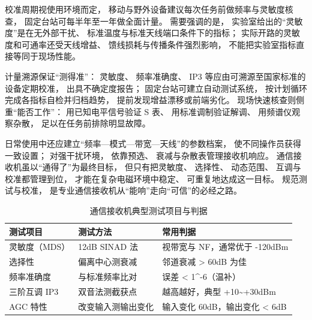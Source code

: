 校准周期视使用环境而定，
移动与野外设备建议每次任务前做频率与灵敏度核查，
固定台站可每半年至一年做全面计量。
需要强调的是，
实验室给出的“灵敏度”是在无外部干扰、
标准温度与标准天线端口条件下的指标；
实际开路的灵敏度和可通率还受天线增益、
馈线损耗与传播条件强烈影响，
不能把实验室指标直接等同于现场性能。

计量溯源保证“测得准”：
灵敏度、
频率准确度、
IP3 等应由可溯源至国家标准的设备定期校准，
出具不确定度报告；
固定台站可建立自动测试系统，
按计划循环完成各指标自检并归档趋势，
提前发现增益漂移或前端劣化。
现场快速核查则侧重“能否工作”：
用已知电平信号验证 S 表、
用标准调制验证解调、
用频谱仪观察杂散，
足以在任务前排除明显故障。

日常使用中还应建立“频率—模式—带宽—天线”的参数档案，
使不同操作员获得一致设置；
对强干扰环境，
依靠预选、
衰减与杂散表管理接收机响应。
通信接收机虽以“通得了”为最终目标，
但只有把灵敏度、
选择性、
动态范围、
互调与校准都管理到位，
才能在复杂电磁环境中稳定、
可重复地达成这一目标。
规范测试与校准，
是专业通信接收机从“能响”走向“可信”的必经之路。

\begin{table}[htbp]
\centering
\caption{通信接收机典型测试项目与判据}
\begin{tabular}{|p{4cm}|p{5.5cm}|p{5cm}|}
\hline
\textbf{测试项目} & \textbf{测试方法} & \textbf{常用判据} \\
\hline
灵敏度（MDS） & 12dB SINAD 法 & 视带宽与 NF，通常优于 -120dBm \\
\hline
选择性 & 偏离中心测衰减 & 邻道衰减 > 60dB 为佳 \\
\hline
频率准确度 & 与标准频率比对 & 误差 < 1\times10^{-6}（温补） \\
\hline
三阶互调 IP3 & 双音法测截获点 & 越高越好，典型 +10\sim+30dBm \\
\hline
AGC 特性 & 改变输入测输出变化 & 输入变化 60dB，输出变化 < 6dB \\
\hline
\end{tabular}
\end{table}
